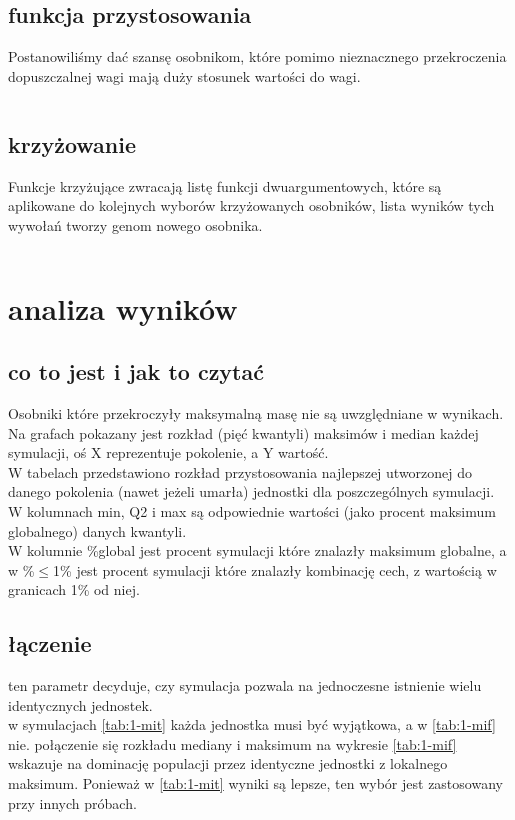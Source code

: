 \documentclass{article}
\begin{document}
\subsection{funkcja przystosowania}
Postanowiliśmy dać szansę osobnikom, które pomimo nieznacznego przekroczenia dopuszczalnej
wagi mają duży stosunek wartości do wagi.
\inputminted{clojure}{snippets/alg.clj_scoring}
\subsection{krzyżowanie}
Funkcje krzyżujące zwracają listę funkcji dwuargumentowych, które są aplikowane
do kolejnych wyborów krzyżowanych osobników, lista wyników tych wywołań tworzy
genom nowego osobnika.
\inputminted{clojure}{snippets/alg.clj_krzyżowanie}

\newpage



\section{analiza wyników}
\subsection{co to jest i jak to czytać}
Osobniki które przekroczyły maksymalną masę nie są uwzględniane w wynikach.
\\
Na grafach pokazany jest rozkład (pięć kwantyli) maksimów i median każdej
symulacji, oś X reprezentuje pokolenie, a Y wartość.
\\
W tabelach przedstawiono rozkład przystosowania najlepszej utworzonej do danego pokolenia
(nawet jeżeli umarła) jednostki dla poszczególnych symulacji.
\\
W kolumnach min, Q2 i max są odpowiednie wartości (jako procent maksimum globalnego) danych kwantyli.
\\
W kolumnie \%global jest procent symulacji które znalazły maksimum globalne, a
w \%$\le$1\% jest procent symulacji które znalazły kombinację cech, z wartością w
granicach 1\% od niej.

\subsection{łączenie}
ten parametr decyduje, czy symulacja pozwala na jednoczesne istnienie wielu
identycznych jednostek.\\
w symulacjach \ref{tab:1-mit} każda jednostka musi być wyjątkowa, a w
\ref{tab:1-mif} nie. połączenie się rozkładu mediany i maksimum na wykresie
\ref{tab:1-mif} wskazuje na dominację populacji przez identyczne jednostki
z lokalnego maksimum. Ponieważ w \ref{tab:1-mit} wyniki są lepsze, ten wybór
jest zastosowany przy innych próbach.
\end{document}
